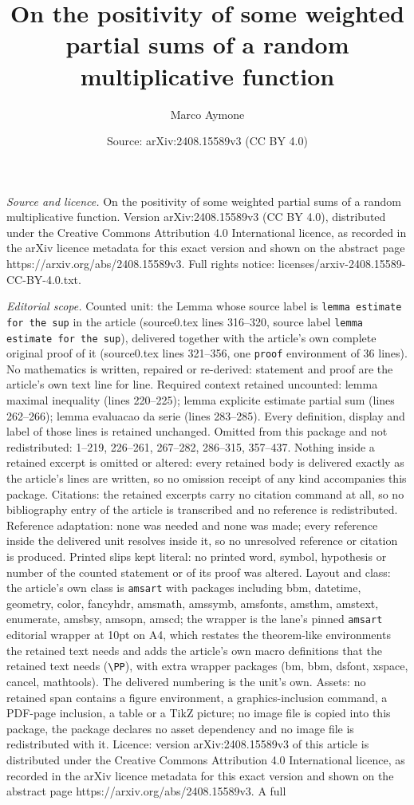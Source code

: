 \documentclass[10pt,a4paper]{amsart}
\title[On the positivity of some weighted partial sums of a random ]{On the positivity of some weighted partial sums of a random multiplicative function}
\author{Marco Aymone}
\date{Source: arXiv:2408.15589v3 (CC BY 4.0)}
\begin{document}
\maketitle

\noindent\emph{Source and licence.} On the positivity of some weighted partial sums of a random multiplicative function. Version arXiv:2408.15589v3 (CC BY 4.0), distributed under the Creative Commons Attribution 4.0 International licence, as recorded in the arXiv licence metadata for this exact version and shown on the abstract page https://arxiv.org/abs/2408.15589v3. Full rights notice: licenses/arxiv-2408.15589-CC-BY-4.0.txt.\par\smallskip

\noindent\textit{Editorial scope.} Counted unit: the Lemma whose source label is \texttt{lemma estimate for the sup} in the article (source0.tex lines 316--320, source label \texttt{lemma estimate for the sup}), delivered together with the article's own complete original proof of it (source0.tex lines 321--356, one \texttt{proof} environment of 36 lines). No mathematics is written, repaired or re-derived: statement and proof are the article's own text line for line. Required context retained uncounted: lemma maximal inequality (lines 220--225); lemma explicite estimate partial sum (lines 262--266); lemma evaluacao da serie (lines 283--285). Every definition, display and label of those lines is retained unchanged. Omitted from this package and not redistributed: 1--219, 226--261, 267--282, 286--315, 357--437. Nothing inside a retained excerpt is omitted or altered: every retained body is delivered exactly as the article's lines are written, so no omission receipt of any kind accompanies this package. Citations: the retained excerpts carry no citation command at all, so no bibliography entry of the article is transcribed and no reference is redistributed. Reference adaptation: none was needed and none was made; every reference inside the delivered unit resolves inside it, so no unresolved reference or citation is produced. Printed slips kept literal: no printed word, symbol, hypothesis or number of the counted statement or of its proof was altered. Layout and class: the article's own class is \texttt{amsart} with packages including bbm, datetime, geometry, color, fancyhdr, amsmath, amssymb, amsfonts, amsthm, amstext, enumerate, amsbsy, amsopn, amscd; the wrapper is the lane's pinned \texttt{amsart} editorial wrapper at 10pt on A4, which restates the theorem-like environments the retained text needs and adds the article's own macro definitions that the retained text needs (\texttt{\textbackslash PP}), with extra wrapper packages (bm, bbm, dsfont, xspace, cancel, mathtools). The delivered numbering is the unit's own. Assets: no retained span contains a figure environment, a graphics-inclusion command, a PDF-page inclusion, a table or a TikZ picture; no image file is copied into this package, the package declares no asset dependency and no image file is redistributed with it. Licence: version arXiv:2408.15589v3 of this article is distributed under the Creative Commons Attribution 4.0 International licence, as recorded in the arXiv licence metadata for this exact version and shown on the abstract page https://arxiv.org/abs/2408.15589v3. A full 
\end{document}
